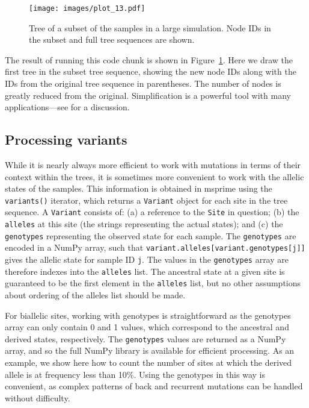 \documentclass[graybox]{svmult}
\begin{document}
\begin{figure}[t]
\centering
\texttt{[image: images/plot\_13.pdf]}
\caption{\label{fig-tree-subset} Tree of a subset of the samples in a large
simulation. Node IDs in the subset and full tree sequences are shown.}
\end{figure}

The result of running this code chunk is shown in Figure~\ref{fig-tree-subset}.
Here we draw the first tree in the subset tree sequence, showing the new
node IDs along with the IDs from the original tree sequence in
parentheses. The number of nodes is greatly reduced from the original.
Simplification is a powerful tool with many applications---see
\cite{wong2024general} for a discussion.

\subsection{Processing variants}\label{processing-variants}

While it is nearly always more efficient to work with mutations in terms
of their context within the trees, it is sometimes more convenient to
work with the allelic states of the samples. This information is
obtained in msprime using the \texttt{variants()} iterator, which
returns a \texttt{Variant} object for each site in the tree sequence. A
\texttt{Variant} consists of: (a) a reference to the \texttt{Site} in question;
(b) the \texttt{alleles} at this site (the strings representing the
actual states); and (c) the \texttt{genotypes} representing the observed
state for each sample. The \texttt{genotypes} are encoded in a NumPy
array, such that
\texttt{variant.alleles[variant.genotypes[j]]}
gives the allelic state for sample ID \texttt{j}. The values in the
\texttt{genotypes} array are therefore indexes into the \texttt{alleles}
list. The ancestral state at a given site is guaranteed to be the first
element in the \texttt{alleles} list, but no other assumptions about
ordering of the alleles list should be made.

For biallelic sites, working with genotypes is straightforward as the
genotypes array can only contain 0 and 1 values, which correspond to
the ancestral and derived states, respectively. The \texttt{genotypes}
values are returned as a NumPy array, and so the full NumPy library is
available for efficient processing. As an example, we show here how to
count the number of sites at which the derived allele is at frequency
less than 10\%. Using the genotypes in this way is convenient, as
complex patterns of back and recurrent mutations can be handled without
difficulty.
\end{document}
